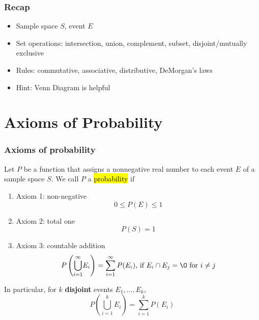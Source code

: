 \documentclass[slidestop,compress,mathserif]{beamer}
\begin{document}
\begin{frame}\frametitle{Recap}

\begin{itemize}

\item Sample space $S$, event $E$
\item Set operations: intersection, union, complement, subset, disjoint/mutually exclusive
\item Rules: commutative, associative, distributive, DeMorgan's laws
\item Hint: Venn Diagram is helpful
\end{itemize}

\end{frame}



%
%


\section{Axioms of Probability}


\begin{frame}\frametitle{Axioms of probability}

\vspace{-0.3cm}
\begin{defn}
Let $P$ be a function that assigns a nonnegative real number to each event $E$ of a sample space $S$.
We call $P$ a \hl{probability} if
 
\begin{enumerate}
\item Axiom 1: non-negative \[0 \leq P(E)  \leq 1\]
\vspace{-0.7cm}
 
\item Axiom 2: total one \[P(S) =  1\]
\vspace{-0.7cm}
 
\item Axiom 3: countable addition
\[P\left(\underset{i=1}{\overset{\infty}{\bigcup}} E_i\right) = \sum_{i=1}^\infty P(E_i) \text{,  if } E_i \cap E_j=\O \text{ for } i \neq j  \]
\end{enumerate}
\end{defn}
 
In particular, for $k$ {\bf disjoint} events $E_1, \ldots, E_k$,
\[P\left(\underset{i=1}{\overset{k}{\bigcup}} E_i\right) = \sum_{i=1}^k P(E_i)\]
\end{frame}
\end{document}
